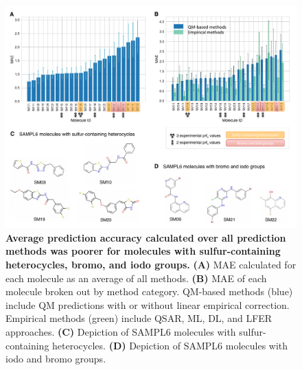 \documentclass[9pt,lineno,final]{elife}
\begin{document}
\begin{figure}
\centering
\includegraphics[width=1.0\linewidth]{figures/typeIII_molecular_MAE_fig.pdf}
\caption{{\bf Average prediction accuracy calculated over all prediction methods was poorer for molecules with sulfur-containing heterocycles, bromo, and iodo groups.}
{\bf(A)} MAE calculated for each molecule as an average of all methods. 
{\bf(B)} MAE of each molecule broken out by method category. QM-based methods (blue) include QM predictions with or without linear empirical correction. 
Empirical methods (green) include QSAR, ML, DL, and LFER approaches. 
{\bf(C)} Depiction of SAMPL6 molecules with sulfur-containing heterocycles. 
{\bf(D)} Depiction of SAMPL6 molecules with iodo and bromo groups.
}
\label{fig:typeIII_molecular_MAE}
\end{figure}
\end{document}
